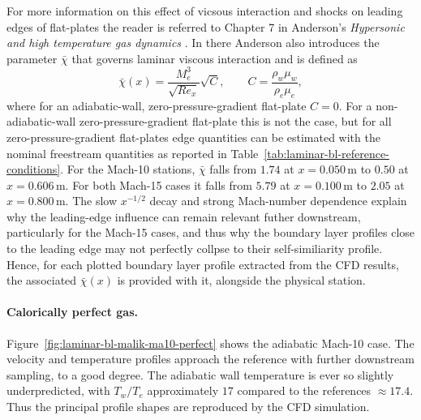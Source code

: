 For more information on this effect of vicsous interaction and shocks on leading edges of flat-plates the reader is referred to Chapter 7 in Anderson's \textit{Hypersonic and high temperature gas dynamics} \cite{anderson1989hypersonic}. In there Anderson also introduces the parameter \(\bar{\chi}\) that governs laminar viscous interaction and is defined as
\begin{equation}
    \bar{\chi}(x)=\frac{M_e^3}{\sqrt{Re_x}}\sqrt{C},
    \qquad
    C=\frac{\rho_w\mu_w}{\rho_e\mu_e},
    \label{eq:laminar-bl-interaction-parameter}
\end{equation}
where for an adiabatic-wall, zero-pressure-gradient flat-plate \(C=0\). For a non-adiabatic-wall zero-pressure-gradient flat-plate this is not the case, but for all zero-pressure-gradient flat-plates edge quantities can be estimated with the nominal freestream quantities as reported in Table~\ref{tab:laminar-bl-reference-conditions}. For the Mach-10 stations, \(\bar{\chi}\) falls from \(1.74\) at \(x=0.050\,\mathrm{m}\) to \(0.50\) at \(x=0.606\,\mathrm{m}\). For both Mach-15 cases it falls from \(5.79\) at \(x=0.100\,\mathrm{m}\)
to \(2.05\) at \(x=0.800\,\mathrm{m}\). The slow \(x^{-1/2}\) decay and strong Mach-number dependence explain why the leading-edge influence can remain relevant futher downstream, particularly for the Mach-15 cases, and thus why the boundary layer profiles close to the leading edge may not perfectly collpse to their self-similiarity profile. Hence, for each plotted boundary layer profile extracted from the CFD results, the associated \(\bar{\chi}(x)\) is provided with it, alongside the physical station.

\paragraph{Calorically perfect gas.}
Figure~\ref{fig:laminar-bl-malik-ma10-perfect} shows the adiabatic Mach-10
case. The velocity and temperature profiles approach the reference with further downstream sampling, to a good degree. The adiabatic wall temperature is ever so slightly
underpredicted, with \(T_w/T_e\) approximately \(17\) compared to the references \(\approx 17.4\). Thus the principal profile shapes are reproduced by the CFD simulation.

